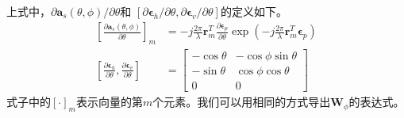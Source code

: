 \documentclass[master]{thesis-uestc}
\begin{document}
上式中，$\partial\bm{a}_s(\theta,\phi)/\partial\theta$和
$\left[\partial\bm{\epsilon}_h/\partial\theta,\partial\bm{\epsilon}_v/\partial\theta\right]$的定义如下。
\begin{subequations}\label{polar_a_s_nd_epsilon_theta}
    \begin{align}
        \left[\frac{\partial\bm{a}_s(\theta,\phi)}{\partial\theta}\right]_m &= 
        -j\frac{2\pi}{\lambda}\bm{r}^T_m\frac{\partial\bm{\epsilon}_p}{\partial\theta}
        \exp\left(-j\frac{2\pi}{\lambda}\bm{r}^T_m\bm{\epsilon}_p\right) \\
        \left[\frac{\partial\bm{\epsilon}_h}{\partial\theta},\frac{\partial\bm{\epsilon}_v}{\partial\theta}\right]
        &=
        \begin{bmatrix}
            -\cos\theta & -\cos\phi\sin\theta \\
            -\sin\theta & \cos\phi\cos\theta \\
            0           & 0
        \end{bmatrix}
    \end{align}
\end{subequations}
式子中的$\left[\cdot\right]_m$表示向量的第$m$个元素。我们可以用相同的方式导出$\bm{W}_\phi$的表达式。
\end{document}
